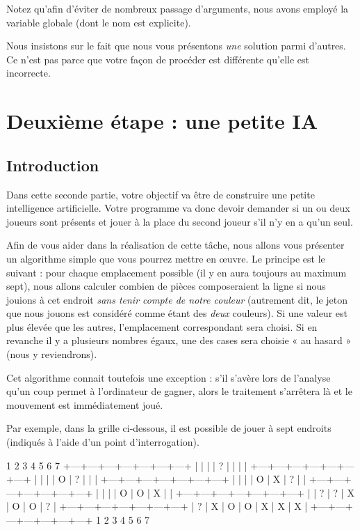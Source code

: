 Notez qu'afin d'éviter de nombreux passage d'arguments, nous avons
employé la variable globale  (dont le nom est explicite).

\begin{infobox} 
 Nous insistons sur le fait que nous
vous présentons \emph{une} solution parmi d'autres. Ce n'est pas parce
que votre façon de procéder est différente qu'elle est incorrecte.
\end{infobox}

\section{Deuxième étape : une petite IA}
\label{deuxieme-etape-:-une-petite-IA}

\subsection{Introduction}
\label{introduction-5}

Dans cette seconde partie, votre objectif va être de construire une
petite intelligence artificielle. Votre programme va donc devoir
demander si un ou deux joueurs sont présents et jouer à la place du
second joueur s'il n'y en a qu'un seul.

Afin de vous aider dans la réalisation de cette tâche, nous allons vous
présenter un algorithme simple que vous pourrez mettre en œuvre. Le
principe est le suivant : pour chaque emplacement possible (il y en aura
toujours au maximum sept), nous allons calculer combien de pièces
composeraient la ligne si nous jouions à cet endroit \emph{sans tenir
compte de notre couleur} (autrement dit, le jeton que nous jouons est
considéré comme étant des \emph{deux} couleurs). Si une valeur est plus
élevée que les autres, l'emplacement correspondant sera choisi. Si en
revanche il y a plusieurs nombres égaux, une des cases sera choisie « au
hasard » (nous y reviendrons).

Cet algorithme connait toutefois une exception : s'il s'avère lors de
l'analyse qu'un coup permet à l'ordinateur de gagner, alors le
traitement s'arrêtera là et le mouvement est immédiatement joué.

Par exemple, dans la grille ci-dessous, il est possible de jouer à sept
endroits (indiqués à l'aide d'un point d'interrogation).

\begin{C}
  1   2   3   4   5   6   7  
+---+---+---+---+---+---+---+
|   |   |   | ? |   |   |   |
+---+---+---+---+---+---+---+
|   |   |   | O | ? |   |   |
+---+---+---+---+---+---+---+
|   |   |   | O | X | ? |   |
+---+---+---+---+---+---+---+
|   |   |   | O | O | X |   |
+---+---+---+---+---+---+---+
|   | ? | ? | X | O | O | ? |
+---+---+---+---+---+---+---+
| ? | X | O | O | X | X | X |
+---+---+---+---+---+---+---+
  1   2   3   4   5   6   7  
\end{C}


